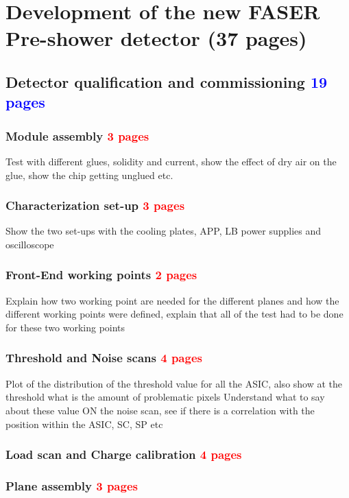 \chapter{Development of the new FASER Pre-shower detector (37 pages)}
	
	\section{Detector qualification and commissioning \textcolor{blue}{ 19 pages}}
		\subsection{Module assembly \textcolor{red}{ 3 pages}}
		Test with different glues, solidity and current, show the effect of dry air on the glue, show the chip getting unglued etc. 
		\subsection{Characterization set-up \textcolor{red}{ 3 pages}}
		Show the two set-ups with the cooling plates, APP, LB power supplies and oscilloscope
		\subsection{Front-End working points \textcolor{red}{ 2 pages}}
		Explain how two working point are needed for the different planes and how the different working points were defined, explain that all of the test had to be done for these two working points
		\subsection{Threshold and Noise scans \textcolor{red}{ 4 pages}}
		Plot of the distribution of the threshold value for all the ASIC, also show at the threshold what is the amount of problematic pixels
		Understand what to say about these value 
		ON the noise scan, see if there is a correlation with the position within the ASIC, SC, SP etc 
		\subsection{Load scan and Charge calibration \textcolor{red}{ 4 pages}} 
		
		
		\subsection{Plane assembly \textcolor{red}{ 3 pages}}
	
